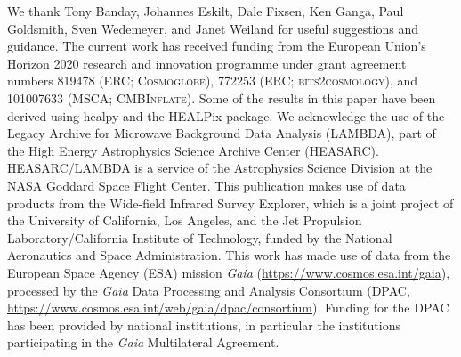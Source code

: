 \documentclass{aa}
\begin{document}
\begin{acknowledgements}
  We thank Tony Banday, Johannes Eskilt, Dale Fixsen, Ken Ganga, Paul
  Goldsmith, Sven Wedemeyer, and Janet Weiland for useful suggestions
  and guidance.  The current work has received funding from the
  European Union’s Horizon 2020 research and innovation programme
  under grant agreement numbers 819478 (ERC; \textsc{Cosmoglobe}),
  772253 (ERC; \textsc{bits2cosmology}), and 101007633 (MSCA;
  \textsc{CMBInflate}).  Some of the results in this paper have been
  derived using healpy \citep{Zonca2019} and the HEALPix
  \citep{healpix} package.  We acknowledge the use of the Legacy
  Archive for Microwave Background Data Analysis (LAMBDA), part of the
  High Energy Astrophysics Science Archive Center
  (HEASARC). HEASARC/LAMBDA is a service of the Astrophysics Science
  Division at the NASA Goddard Space Flight Center. This publication
  makes use of data products from the Wide-field Infrared Survey
  Explorer, which is a joint project of the University of California,
  Los Angeles, and the Jet Propulsion Laboratory/California Institute
  of Technology, funded by the National Aeronautics and Space
  Administration. This work has made use of data from the European
  Space Agency (ESA) mission {\it Gaia}
  (\url{https://www.cosmos.esa.int/gaia}), processed by the {\it Gaia}
  Data Processing and Analysis Consortium (DPAC,
  \url{https://www.cosmos.esa.int/web/gaia/dpac/consortium}). Funding
  for the DPAC has been provided by national institutions, in
  particular the institutions participating in the {\it Gaia}
  Multilateral Agreement.
\end{acknowledgements}



%



\end{document}
